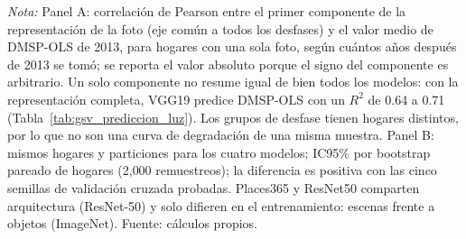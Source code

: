 \begin{table}[H]
\begin{minipage}{0.95\textwidth}
    \footnotesize \textit{Nota:} Panel A: correlación de Pearson entre el primer componente de la representación de la foto (eje común a todos los desfases) y el valor medio de DMSP-OLS de 2013, para hogares con una sola foto, según cuántos años después de 2013 se tomó; se reporta el valor absoluto porque el signo del componente es arbitrario. Un solo componente no resume igual de bien todos los modelos: con la representación completa, VGG19 predice DMSP-OLS con un $R^2$ de 0.64 a 0.71 (Tabla~\ref{tab:gsv_prediccion_luz}). Los grupos de desfase tienen hogares distintos, por lo que no son una curva de degradación de una misma muestra. Panel B: mismos hogares y particiones para los cuatro modelos; IC95\% por bootstrap pareado de hogares (2{,}000 remuestreos); la diferencia es positiva con las cinco semillas de validación cruzada probadas. Places365 y ResNet50 comparten arquitectura (ResNet-50) y solo difieren en el entrenamiento: escenas frente a objetos (ImageNet). Fuente: cálculos propios.
  \end{minipage}
\end{table}
